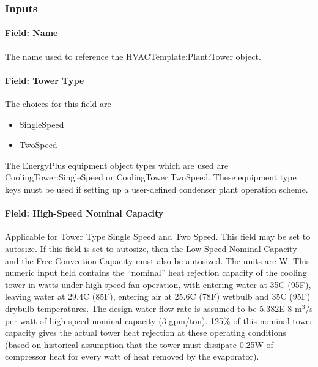 \subsubsection{Inputs}\label{inputs-26-000}

\paragraph{Field: Name}\label{field-name-13-004}

The name used to reference the HVACTemplate:Plant:Tower object.

\paragraph{Field: Tower Type}\label{field-tower-type}

The choices for this field are

\begin{itemize}
\item
  SingleSpeed
\item
  TwoSpeed
\end{itemize}

The EnergyPlus equipment object types which are used are CoolingTower:SingleSpeed or CoolingTower:TwoSpeed. These equipment type keys must be used if setting up a user-defined condenser plant operation scheme.

\paragraph{Field: High-Speed Nominal Capacity}\label{field-high-speed-nominal-capacity-000}

Applicable for Tower Type Single Speed and Two Speed. This field may be set to autosize. If this field is set to autosize, then the Low-Speed Nominal Capacity and the Free Convection Capacity must also be autosized. The units are W. This numeric input field contains the ``nominal'' heat rejection capacity of the cooling tower in watts under high-speed fan operation, with entering water at 35C (95F), leaving water at 29.4C (85F), entering air at 25.6C (78F) wetbulb and 35C (95F) drybulb temperatures. The design water flow rate is assumed to be 5.382E-8 m\(^{3}\)/s per watt of high-speed nominal capacity (3 gpm/ton). 125\% of this nominal tower capacity gives the actual tower heat rejection at these operating conditions (based on historical assumption that the tower must dissipate 0.25W of compressor heat for every watt of heat removed by the evaporator).

